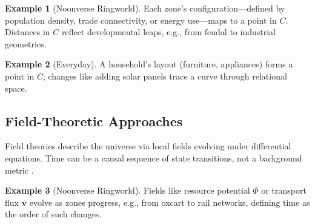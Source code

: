 \documentclass[11pt]{article}
\theoremstyle{plain}
\theoremstyle{definition}
\newtheorem{example}{Example}[section]
\begin{document}
\begin{example}[Noonverse Ringworld]
Each zone’s configuration—defined by population density, trade connectivity, or energy use—maps to a point in $C$. Distances in $C$ reflect developmental leaps, e.g., from feudal to industrial geometries.
\end{example}

\begin{example}[Everyday]
A household’s layout (furniture, appliances) forms a point in $C$; changes like adding solar panels trace a curve through relational space.
\end{example}

\subsection{Field-Theoretic Approaches}
Field theories describe the universe via local fields evolving under differential equations. Time can be a causal sequence of state transitions, not a background metric \citep{Baas2015}.

\begin{example}[Noonverse Ringworld]
Fields like resource potential $\Phi$ or transport flux $\mathbf{v}$ evolve as zones progress, e.g., from oxcart to rail networks, defining time as the order of such changes.
\end{example}
\end{document}
